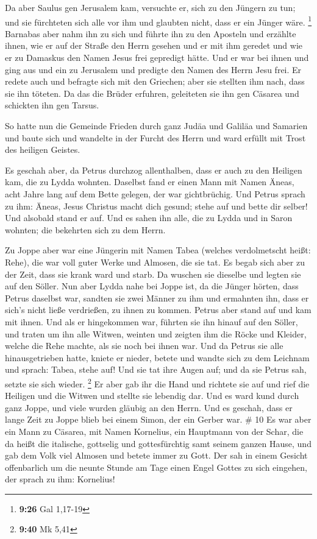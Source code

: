  Da aber Saulus gen Jerusalem kam, versuchte er, sich zu
den Jüngern zu tun; und sie fürchteten sich alle vor ihm und glaubten
nicht, dass er ein Jünger wäre. \footnote{\textbf{9:26} Gal 1,17-19}
 Barnabas aber nahm ihn zu sich und führte ihn zu den
Aposteln und erzählte ihnen, wie er auf der Straße den Herrn gesehen und
er mit ihm geredet und wie er zu Damaskus den Namen Jesus frei gepredigt
hätte.  Und er war bei ihnen und ging aus und ein zu
Jerusalem und predigte den Namen des Herrn Jesu frei.  Er
redete auch und befragte sich mit den Griechen; aber sie stellten ihm
nach, dass sie ihn töteten.  Da das die Brüder erfuhren,
geleiteten sie ihn gen Cäsarea und schickten ihn gen Tarsus.

 So hatte nun die Gemeinde Frieden durch ganz Judäa und
Galiläa und Samarien und baute sich und wandelte in der Furcht des Herrn
und ward erfüllt mit Trost des heiligen Geistes.

 Es geschah aber, da Petrus durchzog allenthalben, dass er
auch zu den Heiligen kam, die zu Lydda wohnten.  Daselbst
fand er einen Mann mit Namen Äneas, acht Jahre lang auf dem Bette
gelegen, der war gichtbrüchig.  Und Petrus sprach zu ihm:
Äneas, Jesus Christus macht dich gesund; stehe auf und bette dir selber!
Und alsobald stand er auf.  Und es sahen ihn alle, die zu
Lydda und in Saron wohnten; die bekehrten sich zu dem Herrn.

 Zu Joppe aber war eine Jüngerin mit Namen Tabea (welches
verdolmetscht heißt: Rehe), die war voll guter Werke und Almosen, die
sie tat.  Es begab sich aber zu der Zeit, dass sie krank
ward und starb. Da wuschen sie dieselbe und legten sie auf den Söller.
 Nun aber Lydda nahe bei Joppe ist, da die Jünger hörten,
dass Petrus daselbst war, sandten sie zwei Männer zu ihm und ermahnten
ihn, dass er sich's nicht ließe verdrießen, zu ihnen zu kommen.
 Petrus aber stand auf und kam mit ihnen. Und als er
hingekommen war, führten sie ihn hinauf auf den Söller, und traten um
ihn alle Witwen, weinten und zeigten ihm die Röcke und Kleider, welche
die Rehe machte, als sie noch bei ihnen war.  Und da Petrus
sie alle hinausgetrieben hatte, kniete er nieder, betete und wandte sich
zu dem Leichnam und sprach: Tabea, stehe auf! Und sie tat ihre Augen
auf; und da sie Petrus sah, setzte sie sich wieder. \footnote{\textbf{9:40}
  Mk 5,41}  Er aber gab ihr die Hand und richtete sie auf
und rief die Heiligen und die Witwen und stellte sie lebendig dar.
 Und es ward kund durch ganz Joppe, und viele wurden
gläubig an den Herrn.  Und es geschah, dass er lange Zeit
zu Joppe blieb bei einem Simon, der ein Gerber war. \# 10 
Es war aber ein Mann zu Cäsarea, mit Namen Kornelius, ein Hauptmann von
der Schar, die da heißt die italische,  gottselig und
gottesfürchtig samt seinem ganzen Hause, und gab dem Volk viel Almosen
und betete immer zu Gott.  Der sah in einem Gesicht
offenbarlich um die neunte Stunde am Tage einen Engel Gottes zu sich
eingehen, der sprach zu ihm: Kornelius!

